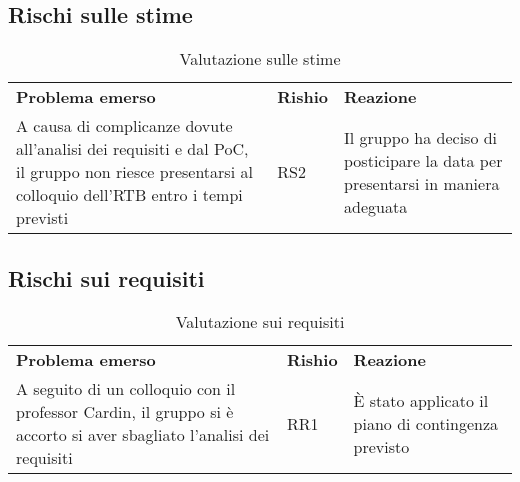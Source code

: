 \clearpage
\subsection{Rischi sulle stime}
    \begin{table}[h]
        \begin{adjustbox}{width=\textwidth}
            \centering
            \renewcommand{\arraystretch}{1.1}
                \begin{tabular}{>{\centering\arraybackslash} m{5cm} >{\centering\arraybackslash} m{1.5cm} >{\centering\arraybackslash} m{4cm}}
                    \rowcolor[HTML]{bfbfbf} 
                    \textbf{Problema emerso} & \textbf{Rishio} & \textbf{Reazione} \\
                    A causa di complicanze dovute all'analisi dei requisiti e dal PoC, il gruppo non riesce presentarsi al colloquio dell'RTB entro i tempi previsti & RS2 & Il gruppo ha deciso di posticipare la data per presentarsi in maniera adeguata\\
                \end{tabular}
            \end{adjustbox}
        \caption{Valutazione sulle stime}
    \end{table}


\subsection{Rischi sui requisiti}
    \begin{table}[h]
        \begin{adjustbox}{width=\textwidth}
            \centering
            \renewcommand{\arraystretch}{1.1}
                \begin{tabular}{>{\centering\arraybackslash} m{5cm} >{\centering\arraybackslash} m{1.5cm} >{\centering\arraybackslash} m{4cm}}
                    \rowcolor[HTML]{bfbfbf} 
                    \textbf{Problema emerso} & \textbf{Rishio} & \textbf{Reazione} \\
                    A seguito di un colloquio con il professor Cardin, il gruppo si è accorto si aver sbagliato l'analisi dei requisiti & RR1 & È stato applicato il piano di contingenza previsto \\
                \end{tabular}
            \end{adjustbox}
        \caption{Valutazione sui requisiti}
    \end{table}